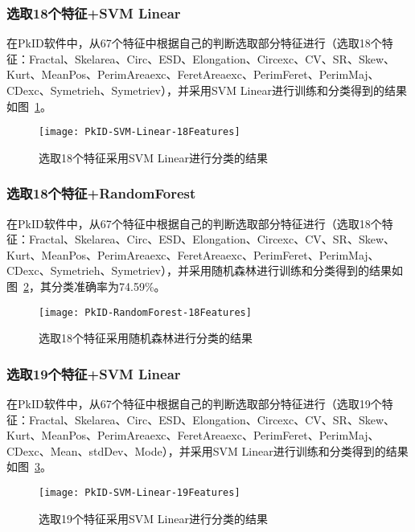\subsubsection{选取18个特征+SVM Linear}
在PkID软件中，从67个特征中根据自己的判断选取部分特征进行（选取18个特征：Fractal、Skelarea、Circ、ESD、Elongation、Circexc、CV、SR、Skew、Kurt、MeanPos、PerimAreaexc、FeretAreaexc、PerimFeret、PerimMaj、CDexc、Symetrieh、Symetriev），并采用SVM Linear进行训练和分类得到的结果如图~\ref{fig:PkID-SVM-Linear-18Features}。

\begin{figure}[!ht]
\centering
\texttt{[image: PkID-SVM-Linear-18Features]}
\caption{选取18个特征采用SVM Linear进行分类的结果}
\label{fig:PkID-SVM-Linear-18Features}
\end{figure}

\subsubsection{选取18个特征+RandomForest}
在PkID软件中，从67个特征中根据自己的判断选取部分特征进行（选取18个特征：Fractal、Skelarea、Circ、ESD、Elongation、Circexc、CV、SR、Skew、Kurt、MeanPos、PerimAreaexc、FeretAreaexc、PerimFeret、PerimMaj、CDexc、Symetrieh、Symetriev），并采用随机森林进行训练和分类得到的结果如图~\ref{fig:PkID-RandomForest-18Features}，其分类准确率为74.59\%。

\begin{figure}[!ht]
\centering
\texttt{[image: PkID-RandomForest-18Features]}
\caption{选取18个特征采用随机森林进行分类的结果}
\label{fig:PkID-RandomForest-18Features}
\end{figure}

\subsubsection{选取19个特征+SVM Linear}
在PkID软件中，从67个特征中根据自己的判断选取部分特征进行（选取19个特征：Fractal、Skelarea、Circ、ESD、Elongation、Circexc、CV、SR、Skew、Kurt、MeanPos、PerimAreaexc、FeretAreaexc、PerimFeret、PerimMaj、CDexc、Mean、stdDev、Mode），并采用SVM Linear进行训练和分类得到的结果如图~\ref{fig:PkID-SVM-Linear-19Features}。

\begin{figure}[!ht]
\centering
\texttt{[image: PkID-SVM-Linear-19Features]}
\caption{选取19个特征采用SVM Linear进行分类的结果}
\label{fig:PkID-SVM-Linear-19Features}
\end{figure}

